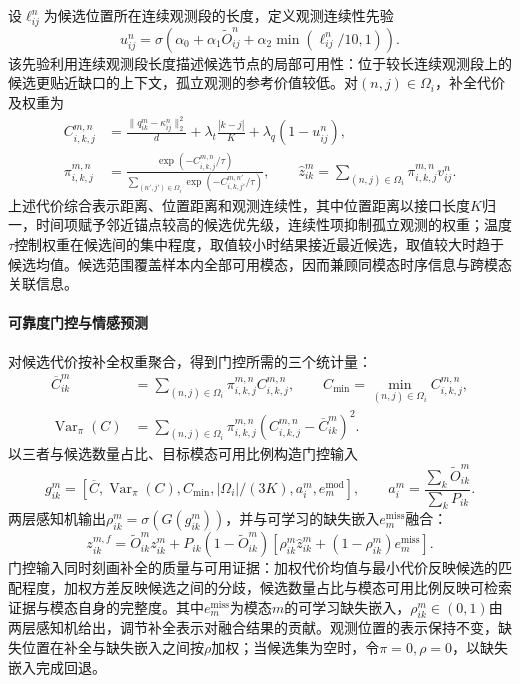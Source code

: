设$\ell^n_{ij}$为候选位置所在连续观测段的长度，定义观测连续性先验
\begin{equation}
u^n_{ij}=\sigma\left(\alpha_0+\alpha_1\widetilde O^n_{ij}
+\alpha_2\min(\ell^n_{ij}/10,1)\right).
\end{equation}
该先验利用连续观测段长度描述候选节点的局部可用性：位于较长连续观测段上的候选更贴近缺口的上下文，孤立观测的参考价值较低。对$(n,j)\in\Omega_i$，补全代价及权重为
\begin{align}
C^{m,n}_{i,k,j}&=\frac{\|q^m_{ik}-\kappa^n_{ij}\|_2^2}{d}
+\lambda_t\frac{|k-j|}{K}+\lambda_q(1-u^n_{ij}),\\
\pi^{m,n}_{i,k,j}&=\frac{\exp(-C^{m,n}_{i,k,j}/\tau)}
{\sum_{(n',j')\in\Omega_i}\exp(-C^{m,n'}_{i,k,j'}/\tau)},\qquad
\hat z^m_{ik}=\sum_{(n,j)\in\Omega_i}\pi^{m,n}_{i,k,j}v^n_{ij}.
\end{align}
上述代价综合表示距离、位置距离和观测连续性，其中位置距离以接口长度$K$归一，时间项赋予邻近锚点较高的候选优先级，连续性项抑制孤立观测的权重；温度$\tau$控制权重在候选间的集中程度，取值较小时结果接近最近候选，取值较大时趋于候选均值。候选范围覆盖样本内全部可用模态，因而兼顾同模态时序信息与跨模态关联信息。

\paragraph{可靠度门控与情感预测}
对候选代价按补全权重聚合，得到门控所需的三个统计量：
\begin{equation}
\begin{aligned}
\overline C^{m}_{ik}&=\sum_{(n,j)\in\Omega_i}\pi^{m,n}_{i,k,j}C^{m,n}_{i,k,j},\qquad
C_{\min}=\min_{(n,j)\in\Omega_i}C^{m,n}_{i,k,j},\\
\operatorname{Var}_{\pi}(C)&=\sum_{(n,j)\in\Omega_i}\pi^{m,n}_{i,k,j}\left(C^{m,n}_{i,k,j}-\overline C^{m}_{ik}\right)^2.
\end{aligned}
\end{equation}
以三者与候选数量占比、目标模态可用比例构造门控输入
\begin{equation}
g^m_{ik}=\left[\overline C,\operatorname{Var}_{\pi}(C),C_{\min},
|\Omega_i|/(3K),a_i^m,e_m^{\mathrm{mod}}\right],\qquad
a_i^m=\frac{\sum_k\widetilde O^m_{ik}}{\sum_kP_{ik}}.
\end{equation}
两层感知机输出$\rho^m_{ik}=\sigma(G(g^m_{ik}))$，并与可学习的缺失嵌入$e_m^{\mathrm{miss}}$融合：
\begin{equation}
z^{m,f}_{ik}=\widetilde O^m_{ik}z^m_{ik}
+P_{ik}(1-\widetilde O^m_{ik})
\left[\rho^m_{ik}\hat z^m_{ik}+(1-\rho^m_{ik})e_m^{\mathrm{miss}}\right].
\end{equation}
门控输入同时刻画补全的质量与可用证据：加权代价均值与最小代价反映候选的匹配程度，加权方差反映候选之间的分歧，候选数量占比与模态可用比例反映可检索证据与模态自身的完整度。其中$e_m^{\mathrm{miss}}$为模态$m$的可学习缺失嵌入，$\rho^m_{ik}\in(0,1)$由两层感知机给出，调节补全表示对融合结果的贡献。观测位置的表示保持不变，缺失位置在补全与缺失嵌入之间按$\rho$加权；当候选集为空时，令$\pi=0,\rho=0$，以缺失嵌入完成回退。

